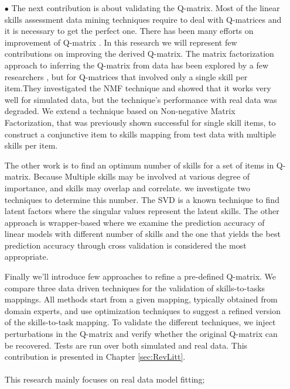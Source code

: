 \begin{itemize}
\DIFdelbegin %
\DIFdelend \DIFaddbegin \item[$\bullet$] \DIFaddend The next contribution is about validating the Q-matrix. Most of the linear skills assessment data mining techniques require to deal with Q-matrices and it is necessary to get the perfect one. There has been many efforts on improvement of Q-matrix \citep{Barnes2005,Desmarais2011b,Winters07}. In this research we will represent few contributions on improving the derived Q-matrix. The matrix factorization approach to inferring the Q-matrix from data has been explored by a few researchers \citep{Barnes2005,Winters07}, but for Q-matrices that involved only a single skill per item.They investigated the \ac{NMF} \citep{Berry2007,Desmarais2011b} technique and showed that it works very well for simulated data, but the technique's performance with real data was degraded. We extend a technique based on Non-negative Matrix Factorization, that was previously shown successful for single skill items, to construct a conjunctive item to skills mapping from test data with multiple skills per item. 

The other work is to find an optimum number of skills for a set of items in Q-matrix. Because Multiple skills may be involved at various degree of importance, and skills may overlap and correlate. we investigate two techniques to determine this number. The \ac{SVD} is a known technique to find latent factors where the singular values represent the latent skills. The other approach is wrapper-based where we examine the prediction accuracy of linear models with different number of skills and the one that yields the best prediction accuracy through cross validation is considered the most appropriate.

Finally we'll introduce few approaches to refine a pre-defined Q-matrix. We compare three data driven techniques for the validation of skills-to-tasks mappings.  All methods start from a given mapping, typically obtained from domain experts, and use optimization techniques to suggest a refined version of the skills-to-task mapping.  To validate the different techniques, we inject perturbations in the Q-matrix and verify whether the original Q-matrix can be recovered. Tests are run over both simulated and real data. This contribution is presented in Chapter \ref{sec:RevLitt}.

\paragraph{}This research mainly focuses on real data model fitting; 

\DIFdelbegin %
\DIFdelend \DIFaddbegin \end{itemize}
\DIFaddend 

